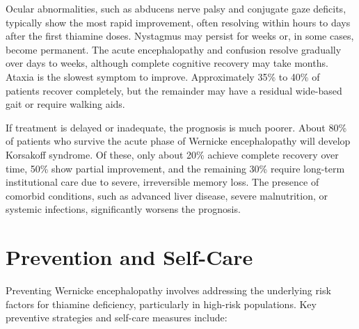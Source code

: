 Ocular abnormalities, such as abducens nerve palsy and conjugate gaze deficits, typically show the most rapid improvement, often resolving within hours to days after the first thiamine doses. Nystagmus may persist for weeks or, in some cases, become permanent. The acute encephalopathy and confusion resolve gradually over days to weeks, although complete cognitive recovery may take months. Ataxia is the slowest symptom to improve. Approximately 35\% to 40\% of patients recover completely, but the remainder may have a residual wide-based gait or require walking aids.

If treatment is delayed or inadequate, the prognosis is much poorer. About 80\% of patients who survive the acute phase of Wernicke encephalopathy will develop Korsakoff syndrome. Of these, only about 20\% achieve complete recovery over time, 50\% show partial improvement, and the remaining 30\% require long-term institutional care due to severe, irreversible memory loss. The presence of comorbid conditions, such as advanced liver disease, severe malnutrition, or systemic infections, significantly worsens the prognosis.

\section*{Prevention and Self-Care}
Preventing Wernicke encephalopathy involves addressing the underlying risk factors for thiamine deficiency, particularly in high-risk populations. Key preventive strategies and self-care measures include:

